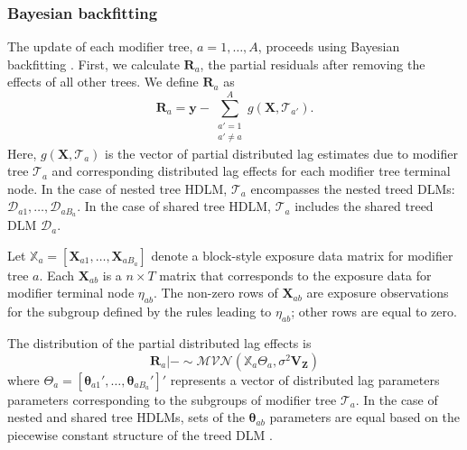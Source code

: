 \documentclass[12pt]{article}
\begin{document}
\subsubsection{Bayesian backfitting}
The update of each modifier tree, $a=1,\ldots,A$, proceeds using Bayesian backfitting \citep{Hastie2000}. First, we calculate $\mathbf{R}_a$, the partial residuals after removing the effects of all other trees. We define $\mathbf{R}_a$ as
\begin{equation}\label{eq:dlm-resid}
    \mathbf{R}_{a}=\mathbf{y}-\sum_{\substack{a'=1\\a'\not=a}}^A g(\mathbf{X}, \mathcal{T}_{a'}).
\end{equation}
Here, $g(\mathbf{X}, \mathcal{T}_{a})$ is the vector of partial distributed lag estimates due to modifier tree $\mathcal{T}_{a}$ and corresponding distributed lag effects for each modifier tree terminal node. In the case of nested tree HDLM, $\mathcal{T}_{a}$ encompasses the nested treed DLMs: $\mathcal{D}_{a1},\ldots,\mathcal{D}_{aB_a}$. In the case of shared tree HDLM, $\mathcal{T}_a$ includes the shared treed DLM $\mathcal{D}_a$.

Let $\mathbb{X}_a=[\mathbf{X}_{a1},\ldots,\mathbf{X}_{aB_a}]$ denote a block-style exposure data matrix for modifier tree $a$. Each $\mathbf{X}_{ab}$ is a $n\times T$ matrix that corresponds to the exposure data for modifier terminal node $\eta_{ab}$. The non-zero rows of $\mathbf{X}_{ab}$ are exposure observations for the subgroup defined by the rules leading to $\eta_{ab}$; other rows are equal to zero.

The distribution of the partial distributed lag effects is
\begin{equation}
    \label{eq:Ra-partial-dlnm-dist}
    \mathbf{R}_a|- \sim \mathcal{MVN}\left(\mathbb{X}_a\Theta_{a},\sigma^2\mathbf{V_Z} \right)
\end{equation}
where $\Theta_a=[\boldsymbol\theta_{a1}',\ldots,\boldsymbol\theta_{aB_a}']'$ represents a vector of distributed lag parameters parameters corresponding to the subgroups of modifier tree $\mathcal{T}_a$. In the case of nested and shared tree HDLMs, sets of the $\boldsymbol\theta_{ab}$ parameters are equal based on the piecewise constant structure of the treed DLM \citep{Mork2022EstimatingPairs}.
    
\end{document}
